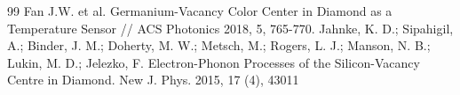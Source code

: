 \begin{thebibliography} {99}
Fan J.W. et al. Germanium-Vacancy Color Center in Diamond
as a Temperature Sensor // ACS Photonics 2018, 5, 765-770.
Jahnke, K. D.; Sipahigil, A.; Binder, J. M.; Doherty, M. W.;
Metsch, M.; Rogers, L. J.; Manson, N. B.; Lukin, M. D.; Jelezko, F.
Electron-Phonon Processes of the Silicon-Vacancy Centre in
Diamond. New J. Phys. 2015, 17 (4), 43011
\end{thebibliography}